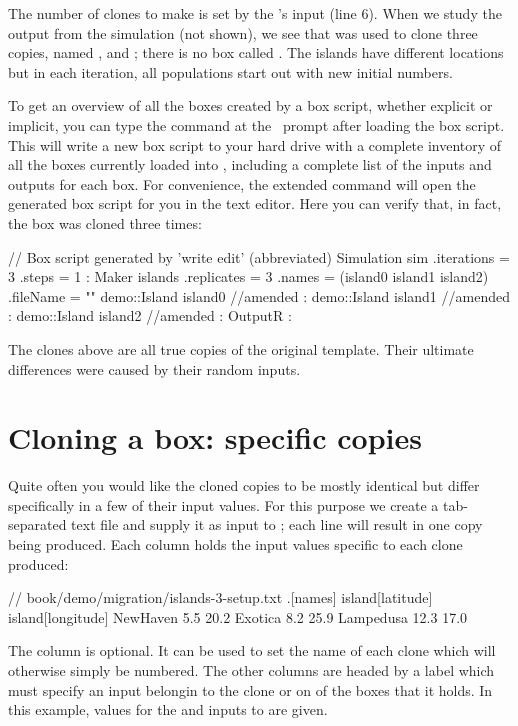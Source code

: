 The number of clones to make is set by the 's  input (line 6). When we study the output from the simulation (not shown), we see that  was used to clone three copies, named ,  and ; there is no box called . The islands have different locations but in each iteration, all populations start out with new initial numbers.

To get an overview of all the boxes created by a box script, whether explicit or implicit, you can type the  command at the \US\ prompt after loading the box script. This will write a new box script to your hard drive with a complete inventory of all the boxes currently loaded into \US, including a complete list of the inputs and outputs for each box. For convenience, the extended command  will open the generated box script for you in the text editor. Here you can verify that, in fact, the  box was cloned three times:
\lstset{numbers=left}
\begin{boxscript}
// Box script generated by 'write edit' (abbreviated)
Simulation sim{
  .iterations = 3
  .steps = 1
	:
  Maker islands{
    .replicates = 3
    .names = (island0 island1 island2)
    .fileName = ""
    demo::Island island0{ //amended
		:
    }
    demo::Island island1{ //amended
		:
    }
    demo::Island island2{ //amended
		:
		}
  }
  OutputR {
	:
  }
}
\end{boxscript}
\lstset{numbers=none}

The clones above are all true copies of the original template. Their ultimate differences were caused by their random inputs. 

\section{Cloning a box: specific copies}
Quite often you would like the cloned copies to be mostly identical but differ specifically in a few of their input values. For this purpose we create a tab-separated text file and supply it as input to ; each line will result in one copy being produced. Each column holds the input values specific to each clone produced:
\begin{boxscript}
// book/demo/migration/islands-3-setup.txt
.[names]	island[latitude]	island[longitude]
NewHaven	5.5	20.2
Exotica	8.2	25.9
Lampedusa	12.3	17.0
\end{boxscript}

The  column is optional. It can be used to set the name of each clone which will otherwise simply be numbered. The other columns are headed by a label which must specify an input belongin to the clone or on of the boxes that it holds. In this example, values for the  and  inputs to  are given. 

